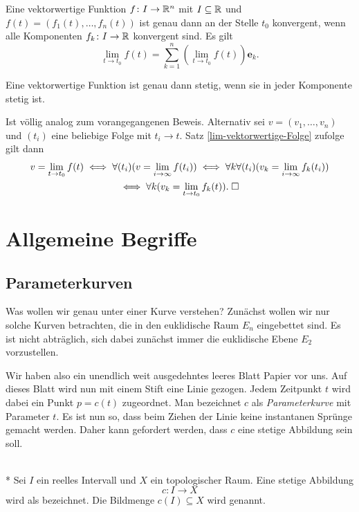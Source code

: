 \begin{theorem}\label{lim-vektorwertige-Funktion}
Eine vektorwertige Funktion $f\colon I\to\mathbb R^n$ mit $I\subseteq\mathbb R$ und
$f(t)=(f_1(t),\ldots,f_n(t))$ ist genau dann an der Stelle $t_0$
konvergent, wenn alle Komponenten $f_k\colon I\to\mathbb R$
konvergent sind. Es gilt%
\begin{equation}
\lim_{t\to t_0} f(t) = \sum_{k=1}^n (\lim_{t\to t_0}f(t))\mathbf e_k.
\end{equation}
\end{theorem}
\begin{corollary}
Eine vektorwertige Funktion ist genau dann stetig, wenn sie in
jeder Komponente stetig ist.
\end{corollary}
 Ist völlig analog zum vorangegangenen Beweis.
Alternativ sei $v=(v_1,\ldots,v_n)$ und $(t_i)$ eine beliebige Folge
mit $t_i\to t$. Satz \ref{lim-vektorwertige-Folge} zufolge gilt dann
\begin{gather}
v = \lim_{t\to t_0} f(t) \iff \forall (t_i)(v=\lim_{i\to\infty} f(t_i))
\iff \forall k\forall(t_i)(v_k = \lim_{i\to\infty} f_k(t_i))\\
\iff \forall k(v_k = \lim_{t\to t_0} f_k(t)).\;\Box
\end{gather}


\section{Allgemeine Begriffe}
\subsection{Parameterkurven}

Was wollen wir genau unter einer Kurve verstehen? Zunächst wollen
wir nur solche Kurven betrachten, die in den euklidische Raum $E_n$
eingebettet sind. Es ist nicht abträglich, sich dabei zunächst immer
die euklidische Ebene $E_2$ vorzustellen.

Wir haben also ein unendlich weit ausgedehntes leeres Blatt Papier
vor uns. Auf dieses Blatt wird nun mit einem Stift eine Linie gezogen.
Jedem Zeitpunkt $t$ wird dabei ein Punkt $p=c(t)$ zugeordnet.
Man bezeichnet $c$ als \emph{Parameterkurve} mit Parameter $t$.
Es ist nun so, dass beim Ziehen der Linie keine instantanen Sprünge
gemacht werden. Daher kann gefordert werden, dass $c$ eine
stetige Abbildung sein soll.

\begin{definition}%
\mbox{}\\*
Sei $I$ ein reelles Intervall und $X$ ein topologischer Raum.
Eine stetige Abbildung%
\begin{equation}
c\colon I\to X
\end{equation}
wird als  bezeichnet. Die Bildmenge
$c(I)\subseteq X$ wird  genannt.
\end{definition}

